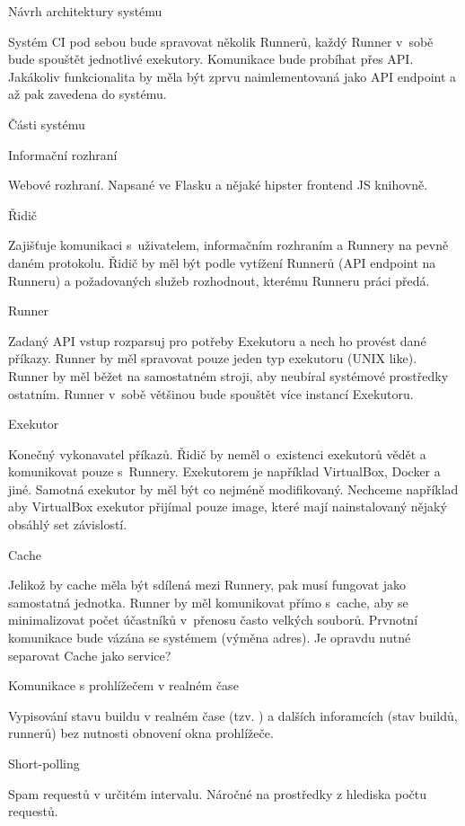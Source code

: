 \chap Návrh architektury systému

Systém CI pod sebou bude spravovat několik Runnerů, každý Runner v~sobě bude spouštět jednotlivé exekutory.
Komunikace bude probíhat přes API.
Jakákoliv funkcionalita by měla být zprvu naimlementovaná jako API endpoint a až pak zavedena do systému.

\sec Části systému

\secc Informační rozhraní

Webové rozhraní.
Napsané ve Flasku a nějaké hipster frontend JS knihovně.

\secc Řidič

Zajišťuje komunikaci s~uživatelem, informačním rozhraním a Runnery na pevně daném protokolu.
Řidič by měl být podle vytížení Runnerů (API endpoint na Runneru) a požadovaných služeb rozhodnout, kterému Runneru práci předá.

\secc Runner

Zadaný API vstup rozparsuj pro potřeby Exekutoru a nech ho provést dané příkazy.
Runner by měl spravovat pouze jeden typ exekutoru (UNIX like).
Runner by měl běžet na samostatném stroji, aby neubíral systémové prostředky ostatním.
Runner v~sobě většinou bude spouštět více instancí Exekutoru.

\seccc Exekutor

Konečný vykonavatel příkazů. Řidič by neměl o~existenci exekutorů vědět a komunikovat pouze s~Runnery.
Exekutorem je například VirtualBox, Docker a jiné.
Samotná exekutor by měl být co nejméně modifikovaný.
Nechceme například aby VirtualBox exekutor přijímal pouze image, které mají nainstalovaný nějaký obsáhlý set závislostí.

\secc Cache

Jelikož by cache měla být sdílená mezi Runnery, pak musí fungovat jako samostatná jednotka.
Runner by měl komunikovat přímo s~cache, aby se minimalizovat počet účastníků v~přenosu často velkých souborů.
Prvnotní komunikace bude vázána se systémem (výměna adres).
Je opravdu nutné separovat Cache jako service?

\sec Komunikace s prohlížečem v realném čase

Vypisování stavu buildu v realném čase (tzv. ) a dalších inforamcích (stav buildů, runnerů) bez nutnosti obnovení okna prohlížeče.

\secc Short-polling

Spam requestů v určitém intervalu.
Náročné na prostředky z hlediska počtu requestů.

